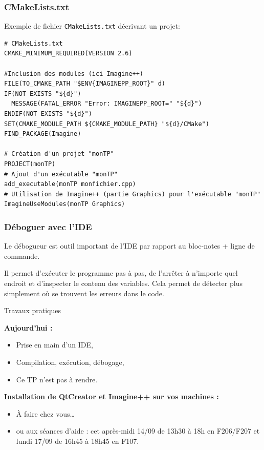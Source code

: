 \begin{frame}[fragile]
  \frametitle{CMakeLists.txt}

Exemple de fichier \texttt{CMakeLists.txt} décrivant un projet:
\begin{verbatim}
# CMakeLists.txt
CMAKE_MINIMUM_REQUIRED(VERSION 2.6)

#Inclusion des modules (ici Imagine++)
FILE(TO_CMAKE_PATH "$ENV{IMAGINEPP_ROOT}" d)
IF(NOT EXISTS "${d}")
  MESSAGE(FATAL_ERROR "Error: IMAGINEPP_ROOT=" "${d}")
ENDIF(NOT EXISTS "${d}")
SET(CMAKE_MODULE_PATH ${CMAKE_MODULE_PATH} "${d}/CMake")
FIND_PACKAGE(Imagine)

# Création d'un projet "monTP"
PROJECT(monTP)
# Ajout d'un exécutable "monTP"
add_executable(monTP monfichier.cpp)
# Utilisation de Imagine++ (partie Graphics) pour l'exécutable "monTP"
ImagineUseModules(monTP Graphics)
\end{verbatim}
\end{frame}

\begin{frame}
	\frametitle{Déboguer avec l'IDE}
	Le débogueur est outil important de l'IDE par rapport au bloc-notes + ligne de commande.

	Il permet d'exécuter le programme pas à pas, de l'arrêter à n'importe quel endroit et d'inspecter le contenu des variables. Cela permet de détecter plus simplement où se trouvent les erreurs dans le code.
\end{frame}

\begin{frame}{Travaux pratiques}

\textbf{Aujourd'hui :}
\begin{itemize}
  \item Prise en main d'un IDE,
  \item Compilation, exécution, débogage,
  \item Ce TP n'est pas à rendre.
\end{itemize}

\textbf{Installation de QtCreator et Imagine++ sur vos machines :}
\begin{itemize}
  \item À faire chez vous\dots
  \item ou aux séances d'aide : cet après-midi 14/09 de 13h30 à 18h en F206/F207 et lundi 17/09 de 16h45 à 18h45 en F107.
\end{itemize}

\end{frame}


